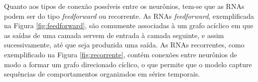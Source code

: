 
Quanto aos tipos de conexão possíveis entre os neurônios, tem-se que as RNAs podem ser do tipo \emph{feedforward} ou recorrente. As RNAs \emph{feedforward}, exemplificada na Figura \ref{fig:feedforward}, são comumente associadas à um grafo acíclico em que as saídas de uma camada servem de entrada à camada seguinte, e assim sucessivamente, até que seja produzida uma saída. As RNAs recorrentes, como exemplificado na Figura \ref{fig:recorrente}, contém conexões entre neurônios de modo a formar um grafo direcionado cíclico, o que permite que o modelo capture sequências de comportamentos organizados em séries temporais.

